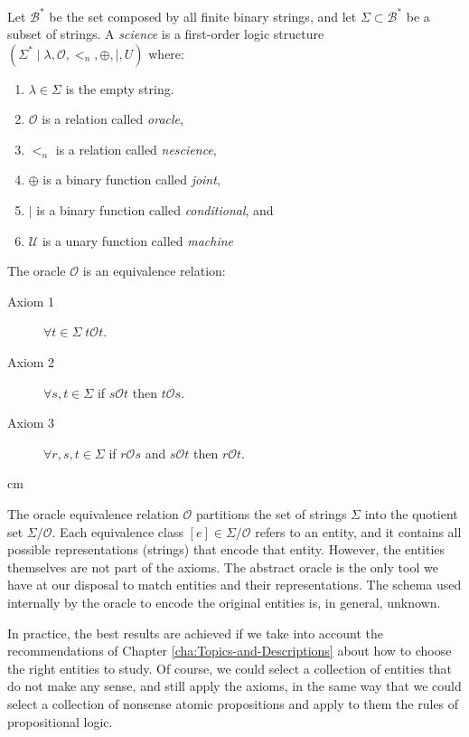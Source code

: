 Let $\mathcal{B}^\ast$ be the set composed by all finite binary strings, and let $\Sigma \subset \mathcal{B}^\ast$ be a subset of strings. A \emph{science} is a first-order logic structure $(\Sigma^\ast \mid \lambda, \mathcal{O}, <_n, \oplus, \mid, U)$ where:

\vskip 0.25cm

\begin{enumerate}[label=(\roman*)]
\item $\lambda \in \Sigma$ is the empty string.
\item $\mathcal{O}$ is a relation called \emph{oracle},
\item $<_n$ is a relation called \emph{nescience},
\item $\oplus$ is a binary function called \emph{joint},
\item $\mid$ is a binary function called \emph{conditional}, and
\item $\mathcal{U}$ is a unary function called \emph{machine}
\end{enumerate}

\vskip 0.25cm

The oracle $\mathcal{O}$ is an equivalence relation:

\vskip 0.25cm

\begin{description}
\item[Axiom 1] $\forall t \in \Sigma \; t \mathcal{O} t$.
\item[Axiom 2] $\forall s , t \in \Sigma$ if $s \mathcal{O} t$ then $t \mathcal{O} s$.
\item[Axiom 3] $\forall r, s , t \in \Sigma$ if $r \mathcal{O} s$ and $s \mathcal{O} t$ then $r \mathcal{O} t$.
\end{description}

 cm

The oracle equivalence relation $\mathcal{O}$ partitions the set of strings $\Sigma$ into the quotient set $\Sigma / \mathcal{O}$. Each equivalence class $[e] \in \Sigma / \mathcal{O}$ refers to an entity, and it contains all possible representations (strings) that encode that entity. However, the entities themselves are not part of the axioms. The abstract oracle is the only tool we have at our disposal to match entities and their representations. The schema used internally by the oracle to encode the original entities is, in general, unknown.

In practice, the best results are achieved if we take into account the recommendations of Chapter \ref{cha:Topics-and-Descriptions} about how to choose the right entities to study. Of course, we could select a collection of entities that do not make any sense, and still apply the axioms, in the same way that we could select a collection of nonsense atomic propositions and apply to them the rules of propositional logic.

